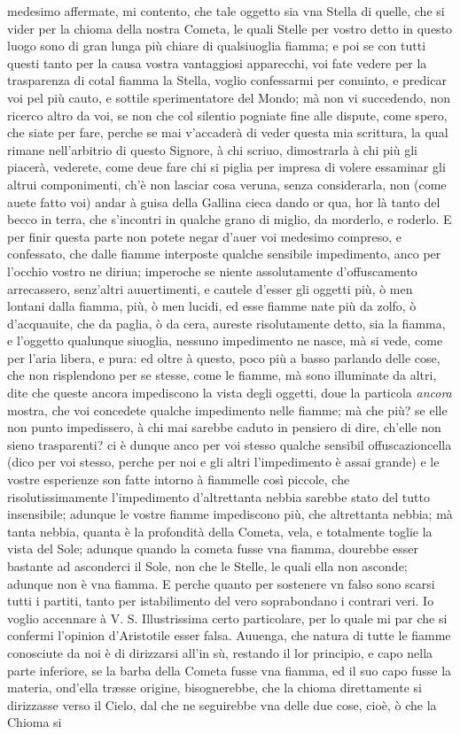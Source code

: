 \documentclass[11pt,twoside,openany]{book}
\begin{document}
medesimo affermate, mi contento, che tale oggetto sia vna Stella di quelle, che si vider per la chioma della nostra Cometa, le quali Stelle per vostro detto in questo luogo sono di gran lunga più chiare di qualsiuoglia fiamma; e poi se con tutti questi tanto per la causa vostra vantaggiosi apparecchi, voi fate vedere per la trasparenza di cotal fiamma la Stella, voglio confessarmi per conuinto, e predicar voi pel più cauto, e sottile sperimentatore del Mondo; mà non vi succedendo, non ricerco altro da voi, se non che col silentio pogniate fine alle dispute, come spero, che siate per fare, perche se mai v'accaderà di veder questa mia scrittura, la qual rimane nell'arbitrio di questo Signore, à chi scriuo, dimostrarla à chi più gli piacerà, vederete, come deue fare chi si piglia per impresa di volere essaminar gli altrui componimenti, ch'è non lasciar cosa veruna, senza considerarla, non (come auete fatto voi) andar à guisa della Gallina cieca dando or qua, hor là tanto del becco in terra, che s'incontri in qualche grano di miglio, da morderlo, e roderlo. E per finir questa parte non potete negar d'auer voi medesimo compreso, e confessato, che dalle fiamme interposte qualche sensibile impedimento, anco per l'occhio vostro ne diriua; imperoche se niente assolutamente d'offuscamento arrecassero, senz'altri auuertimenti, e cautele d'esser gli oggetti più, ò men lontani dalla fiamma, più, ò men lucidi, ed esse fiamme nate più da zolfo, ò d'acquauite, che da paglia, ò da cera, aureste risolutamente detto, sia la fiamma, e l'oggetto qualunque siuoglia, nessuno impedimento ne nasce, mà si vede, come per l'aria libera, e pura: ed oltre à questo, poco più a basso parlando delle cose, che non risplendono per se stesse, come le fiamme, mà sono illuminate da altri, dite che queste ancora impediscono la vista degli oggetti, doue la particola \textit{ancora} mostra, che voi concedete qualche impedimento nelle fiamme; mà che più? se elle non punto impedissero, à chi mai sarebbe caduto in pensiero di dire, ch'elle non sieno trasparenti? ci è dunque anco per voi stesso qualche sensibil offuscazioncella (dico per voi stesso, perche per noi e gli altri l'impedimento è assai grande) e le vostre esperienze son fatte intorno à fiammelle così piccole, che risolutissimamente l'impedimento d'altrettanta nebbia sarebbe stato del tutto insensibile; adunque le vostre fiamme impediscono più, che altrettanta nebbia; mà tanta nebbia, quanta è la profondità della Cometa, vela, e totalmente toglie la vista del Sole; adunque quando la cometa fusse vna fiamma, dourebbe esser bastante ad asconderci il Sole, non che le Stelle, le quali ella non asconde; adunque non è vna fiamma. E perche quanto per sostenere vn falso sono scarsi tutti i partiti, tanto per istabilimento del vero soprabondano i contrari veri. Io voglio accennare à V. S. Illustrissima certo particolare, per lo quale mi par che si confermi l'opinion d'Aristotile esser falsa. Auuenga, che natura di tutte le fiamme conosciute da noi è di dirizzarsi all'in sù, restando il lor principio, e capo nella parte inferiore, se la barba della Cometa fusse vna fiamma, ed il suo capo fusse la materia, ond'ella træsse origine, bisognerebbe, che la chioma direttamente si dirizzasse verso il Cielo, dal che ne seguirebbe vna delle due cose, cioè, ò che la Chioma si 
\end{document}

